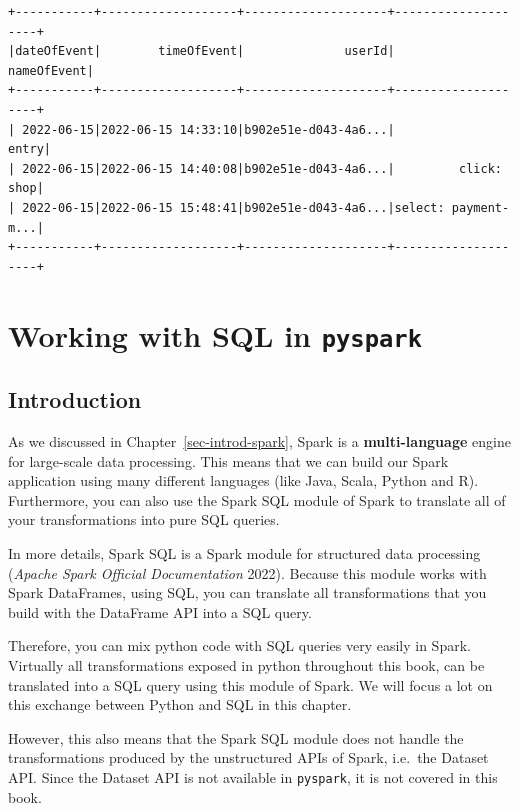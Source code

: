 \documentclass[
  11pt,
  letterpaper,
  DIV=11,
  numbers=noendperiod]{scrreprt}
\begin{document}
\begin{verbatim}
+-----------+-------------------+--------------------+--------------------+
|dateOfEvent|        timeOfEvent|              userId|         nameOfEvent|
+-----------+-------------------+--------------------+--------------------+
| 2022-06-15|2022-06-15 14:33:10|b902e51e-d043-4a6...|               entry|
| 2022-06-15|2022-06-15 14:40:08|b902e51e-d043-4a6...|         click: shop|
| 2022-06-15|2022-06-15 15:48:41|b902e51e-d043-4a6...|select: payment-m...|
+-----------+-------------------+--------------------+--------------------+
\end{verbatim}


\hypertarget{working-with-sql-in-pyspark}{%
\chapter{\texorpdfstring{Working with SQL in
\texttt{pyspark}}{Working with SQL in pyspark}}\label{working-with-sql-in-pyspark}}

\hypertarget{introduction-6}{%
\section{Introduction}\label{introduction-6}}

As we discussed in Chapter~\ref{sec-introd-spark}, Spark is a
\textbf{multi-language} engine for large-scale data processing. This
means that we can build our Spark application using many different
languages (like Java, Scala, Python and R). Furthermore, you can also
use the Spark SQL module of Spark to translate all of your
transformations into pure SQL queries.

In more details, Spark SQL is a Spark module for structured data
processing (\emph{Apache Spark Official Documentation} 2022). Because
this module works with Spark DataFrames, using SQL, you can translate
all transformations that you build with the DataFrame API into a SQL
query.

Therefore, you can mix python code with SQL queries very easily in
Spark. Virtually all transformations exposed in python throughout this
book, can be translated into a SQL query using this module of Spark. We
will focus a lot on this exchange between Python and SQL in this
chapter.

However, this also means that the Spark SQL module does not handle the
transformations produced by the unstructured APIs of Spark, i.e.~the
Dataset API. Since the Dataset API is not available in \texttt{pyspark},
it is not covered in this book.
\end{document}
